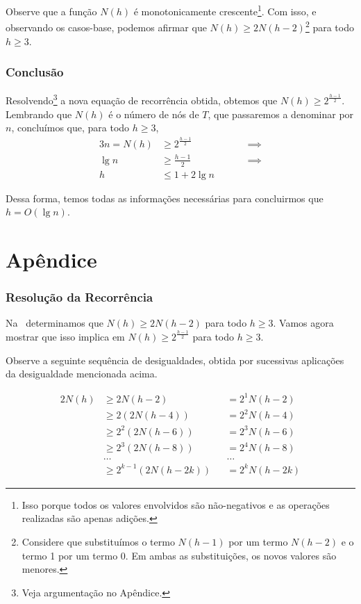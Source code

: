 \documentclass[11pt,twoside]{article}
\theoremstyle{definition}
\begin{document}
      Observe que a função \( N(h) \) é monotonicamente crescente\footnote{Isso porque todos os valores envolvidos são não-negativos e as operações realizadas são apenas adições.}. Com isso, e observando os casos-base, podemos afirmar que \( N(h) \geq 2N(h-2) \)\footnote{Considere que substituímos o termo \( N(h-1) \) por um termo \( N(h-2) \) e o termo 1 por um termo 0. Em ambas as substituições, os novos valores são menores.} para todo \( h \geq 3 \).

    \section{Conclusão}

     Resolvendo\footnote{Veja argumentação no Apêndice.} a nova equação de recorrência obtida, obtemos que \( N(h) \geq 2^{\frac{h-1}{2}} \). Lembrando que \( N(h) \) é o número de nós de \( T \), que passaremos a denominar por \( n \), concluímos que, para todo \( h \geq 3 \),
     \begin{alignat*}{3}
       n = N(h) & \geq 2^{\frac{h-1}{2}} & \quad &  & \implies \\
       \lg n    & \geq \frac{h-1}{2}     & \quad &  & \implies \\
       h        & \leq 1 + 2 \lg n       & \quad &  &
     \end{alignat*}

     Dessa forma, temos todas as informações necessárias para concluirmos que \( h = O(\lg n) \).

  \part*{Apêndice}

    \section{Resolução da Recorrência}

     Na~ determinamos que \( N(h) \geq 2N(h-2) \) para todo \( h \geq 3 \). Vamos agora mostrar que isso implica em \( N(h) \geq 2^{\frac{h-1}{2}} \) para todo \( h \geq 3 \).

     Observe a seguinte sequência de desigualdades, obtida por sucessivas aplicações da desigualdade mencionada acima.

     \begin{alignat*}{2}
       N(h) & \geq 2N(h-2)           &  & = 2^1 N(h-2)  \\
            & \geq 2(2N(h-4))        &  & = 2^2 N(h-4)  \\
            & \geq 2^2(2N(h-6))      &  & = 2^3 N(h-6)  \\
            & \geq 2^3(2N(h-8))      &  & = 2^4 N(h-8)  \\
            & \dots                  &  & \dots         \\
            & \geq 2^{k-1}(2N(h-2k)) &  & = 2^k N(h-2k)
     \end{alignat*}
\end{document}
